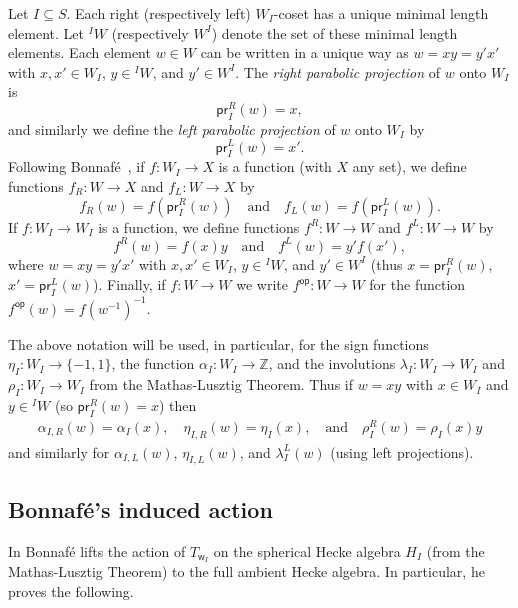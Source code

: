 \documentclass[11pt]{article}
\theoremstyle{plain}
\theoremstyle{definition}
\numberwithin{equation}{section}
\def\pr{\mathsf{pr}}
\newcommand{\la}{\lambda}
\def\ZZ{\mathbb{Z}}
\def\la{\lambda}
\def\la{\lambda}
\newcommand{\sw}{\mathsf{w}}
\begin{document}
Let $I\subseteq S$. Each right (respectively left) $W_I$-coset has a unique minimal length element. Let ${^I}W$ (respectively $W^I$) denote the set of these minimal length elements. Each element $w\in W$ can be written in a unique way as $w=xy=y'x'$ with $x,x'\in W_I$, $y\in {^I}W$, and $y'\in W^I$. The \textit{right parabolic projection} of $w$ onto $W_I$ is 
$$
\pr_I^R(w)=x,
$$
and similarly we define the \textit{left parabolic projection} of $w$ onto $W_I$ by
$$
\pr_I^L(w)=x'. 
$$
Following Bonnaf\'e~\cite{Bon:16}, if $f:W_I\to X$ is a function (with $X$ any set), we define functions $f_R:W\to X$ and $f_L:W\to X$ by 
$$
f_R(w)=f(\pr_I^R(w))\quad\text{and}\quad f_L(w)=f(\pr_I^L(w)). 
$$
If $f:W_I\to W_I$ is a function, we define functions $f^R:W\to W$ and $f^L:W\to W$ by 
$$
f^R(w)=f(x)y\quad\text{and}\quad f^L(w)=y'f(x'),
$$
where $w=xy=y'x'$ with $x,x'\in W_I$, $y\in {^I}W$, and $y'\in W^I$ (thus $x=\pr_I^R(w)$, $x'=\pr_I^L(w)$). Finally, if $f:W\to W$ we write $f^{\mathsf{op}}:W\to W$ for the function $f^{\mathsf{op}}(w)=f(w^{-1})^{-1}$. 


The above notation will be used, in particular, for the sign functions $\eta_I:W_I\to \{-1,1\}$, the function $\alpha_I:W_I\to\ZZ$, and the involutions $\la_I:W_I\to W_I$ and $\rho_I:W_I\to W_I$ from the Mathas-Lusztig Theorem. Thus if $w=xy$ with $x\in W_I$ and $y\in {^I}W$ (so $\pr_I^R(w)=x$) then 
\begin{align*}
\alpha_{I,R}(w)=\alpha_I(x),\quad \eta_{I,R}(w)=\eta_I(x),\quad\text{and}\quad \rho_I^R(w)=\rho_I(x)y
\end{align*}
and similarly for $\alpha_{I,L}(w)$, $\eta_{I,L}(w)$, and $\lambda_I^L(w)$ (using left projections). 




\subsection{Bonnaf\'{e}'s induced action}


In \cite[Corollary 4.10]{Bon:16} Bonnaf\'e lifts the action of $T_{\sw_I}$ on the spherical Hecke algebra $H_I$ (from the Mathas-Lusztig Theorem) to the full ambient Hecke algebra. In particular, he proves the following. 
\end{document}
